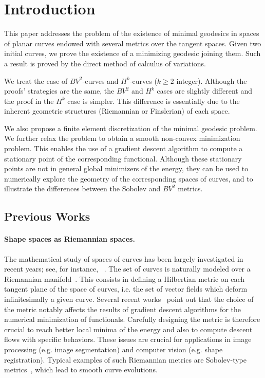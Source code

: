 
\section{Introduction}\label{intro}

This paper addresses the problem of the existence of minimal geodesics in spaces of planar curves endowed with several metrics over the tangent spaces. Given two initial curves, we prove the existence of a minimizing geodesic joining them. Such a result is proved by the direct method of calculus of variations.

We treat the case of  $BV^2$-curves and $H^k$-curves ($k\geq 2$ integer). Although the proofs' strategies are the same, the $BV^2$ and $H^k$ cases are slightly different and the proof in the $H^k$ case is simpler. This difference is essentially due to the inherent geometric structures (Riemannian or Finslerian) of each space. 

We also propose a finite element discretization of the minimal geodesic problem. We further relax the problem to obtain a smooth non-convex minimization problem. This enables the use of a gradient descent algorithm to compute a stationary point of the corresponding functional. Although these stationary points are not in general global minimizers of the energy, they can be used to numerically explore  the geometry of the corresponding spaces of curves, and to illustrate the differences between the Sobolev and $BV^2$ metrics.


\subsection{Previous Works}
\label{sec-previous-works}

\paragraph{Shape spaces as Riemannian spaces.}

The  mathematical study of spaces of curves has been largely investigated in recent years; see, for instance, ~\cite{Younes-elastic-distance,Mennucci-CIME}. 
%
The set of curves is naturally modeled over a Riemannian manifold~\cite{MaMi}. This consists in defining  a Hilbertian metric on each tangent plane of the space of curves, i.e. the set of vector fields which deform infinitesimally a given curve. 
%
Several recent works~\cite{MaMi,charpiat-new-metrics,Yezzi-Menn-2005a,Yezzi-Menn-2005b} point out that  the choice of the metric notably affects the results of gradient descent algorithms for the numerical minimization of functionals. Carefully designing the metric is therefore crucial to reach better local minima of the energy and also to compute descent flows with specific behaviors. These issues are crucial for applications in image processing (e.g. image segmentation) and computer vision (e.g. shape registration).
% 
Typical examples of such  Riemannian metrics are Sobolev-type metrics~\cite{sundaramoorthi-sobolev-active,sundaramoorthi-2006,sundaramoorthi-new-possibilities,Yezzi-H2}, which lead to smooth curve evolutions. 

